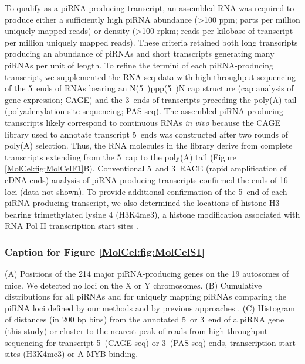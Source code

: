     To qualify as a piRNA-producing transcript, an assembled RNA was required to produce either a sufficiently high piRNA abundance (>100 ppm; parts per million uniquely mapped reads) or density (>100 rpkm; reads per kilobase of transcript per million uniquely mapped reads). These criteria retained both long transcripts producing an abundance of piRNAs and short transcripts generating many piRNAs per unit of length. To refine the termini of each piRNA-producing transcript, we supplemented the RNA-seq data with high-throughput sequencing of the 5\textprime~ends of RNAs bearing an N(5\textprime~)ppp(5\textprime~)N cap structure (cap analysis of gene expression; CAGE) and the 3\textprime~ends of transcripts preceding the poly(A) tail (polyadenylation site sequencing; PAS-seq). The assembled piRNA-producing transcripts likely correspond to continuous RNAs \textit{in vivo} because the CAGE library used to annotate transcript 5\textprime~ends was constructed after two rounds of poly(A) selection. Thus, the RNA molecules in the library derive from complete transcripts extending from the 5\textprime~cap to the poly(A) tail (Figure \ref{MolCel:fig:MolCelF1}B). Conventional 5\textprime~and 3\textprime~RACE (rapid amplification of cDNA ends) analysis of piRNA-producing transcripts confirmed the ends of 16 loci (data not shown). To provide additional confirmation of the 5\textprime~end of each piRNA-producing transcript, we also determined the locations of histone H3 bearing trimethylated lysine 4 (H3K4me3), a histone modification associated with RNA Pol II transcription start sites \cite{Guenther2007}.

    \subsubsection{Caption for Figure \ref{MolCel:fig:MolCelS1}}
      \label{MolCel:subsubsec:cap:Figure S1}
      (A) Positions of the 214 major piRNA-producing genes on the 19 autosomes of mice. We detected no loci on the X or Y chromosomes. (B) Cumulative distributions for all piRNAs and for uniquely mapping piRNAs comparing the piRNA loci defined by our methods and by previous approaches \citep{Girard2006, Lau2006}. (C) Histogram of distances (in 200 bp bins) from the annotated 5\textprime~or 3\textprime~end of a piRNA gene (this study) or cluster to the nearest peak of reads from high-throughput sequencing for transcript 5\textprime~(CAGE-seq) or 3\textprime~(PAS-seq) ends, transcription start sites (H3K4me3) or A-MYB binding.


